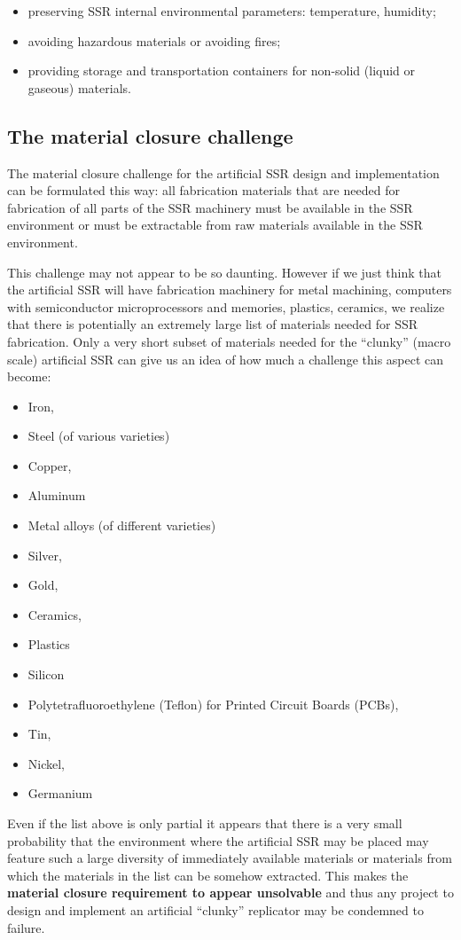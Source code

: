 \documentclass[letterpaper]{article}
\begin{document}
\begin{itemize}
\begin{itemize}
\item preserving SSR internal environmental parameters: temperature,
humidity; 
\item avoiding hazardous materials or avoiding fires;
\item providing storage and transportation containers for non-solid
(liquid or gaseous) materials.
\end{itemize}
\end{itemize}
\subsection[The material closure challenge]{The material closure
challenge}
\hypertarget{RefHeading3140306210128}{}The material closure challenge
for the artificial SSR design and implementation can be formulated this
way: all fabrication materials that are needed for fabrication of all
parts of the SSR machinery must be available in the SSR environment or
must be extractable from raw materials available in the SSR
environment.


\bigskip

This challenge may not appear to be so daunting. However if we just
think that the artificial SSR will have fabrication machinery for metal
machining, computers with semiconductor microprocessors and memories,
plastics, ceramics, we realize that there is potentially an extremely
large list of materials needed for SSR fabrication. Only a very short
subset of materials needed for the “clunky” (macro scale) artificial
SSR can give us an idea of how much a challenge this aspect can become:


\bigskip

\begin{itemize}
\item Iron,
\item Steel (of various varieties)
\item Copper,
\item Aluminum
\item Metal alloys (of different varieties)
\item Silver,
\item Gold,
\item Ceramics,
\item Plastics
\item Silicon
\item Polytetrafluoroethylene (Teflon) for Printed Circuit Boards
(PCBs),
\item Tin,
\item Nickel,
\item Germanium
\end{itemize}
Even if the list above is only partial it appears that there is a very
small probability that the environment where the artificial SSR may be
placed may feature such a large diversity of immediately available
materials or materials from which the materials in the list can be
somehow extracted. This makes the \textbf{material closure requirement
to appear unsolvable} and thus any project to design and implement an
artificial “clunky” replicator may be condemned to failure. 
\end{document}
